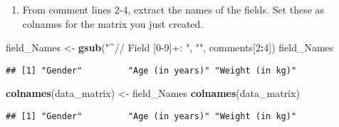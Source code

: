 \documentclass[
]{article}
\newenvironment{Shaded}{\begin{snugshade}}{\end{snugshade}}
\newcommand{\DecValTok}[1]{\textcolor[rgb]{0.00,0.00,0.81}{#1}}
\newcommand{\FunctionTok}[1]{\textcolor[rgb]{0.13,0.29,0.53}{\textbf{#1}}}
\newcommand{\NormalTok}[1]{#1}
\newcommand{\OtherTok}[1]{\textcolor[rgb]{0.56,0.35,0.01}{#1}}
\newcommand{\SpecialCharTok}[1]{\textcolor[rgb]{0.81,0.36,0.00}{\textbf{#1}}}
\newcommand{\StringTok}[1]{\textcolor[rgb]{0.31,0.60,0.02}{#1}}
\providecommand{\tightlist}{%
  \setlength{\itemsep}{0pt}\setlength{\parskip}{0pt}}
\begin{document}
\begin{enumerate}
\def\labelenumi{\alph{enumi}.}
\setcounter{enumi}{3}
\tightlist
\item
  From comment lines 2-4, extract the names of the fields. Set these as
  colnames for the matrix you just created.
\end{enumerate}

\begin{Shaded}
\begin{Highlighting}[]
\NormalTok{field\_Names }\OtherTok{\textless{}{-}} \FunctionTok{gsub}\NormalTok{(}\StringTok{"\^{}// Field [0{-}9]+: "}\NormalTok{, }\StringTok{""}\NormalTok{, comments[}\DecValTok{2}\SpecialCharTok{:}\DecValTok{4}\NormalTok{])}
\NormalTok{field\_Names}
\end{Highlighting}
\end{Shaded}

\begin{verbatim}
## [1] "Gender"         "Age (in years)" "Weight (in kg)"
\end{verbatim}

\begin{Shaded}
\begin{Highlighting}[]
\FunctionTok{colnames}\NormalTok{(data\_matrix) }\OtherTok{\textless{}{-}}\NormalTok{ field\_Names}
\FunctionTok{colnames}\NormalTok{(data\_matrix)}
\end{Highlighting}
\end{Shaded}

\begin{verbatim}
## [1] "Gender"         "Age (in years)" "Weight (in kg)"
\end{verbatim}
\end{document}
